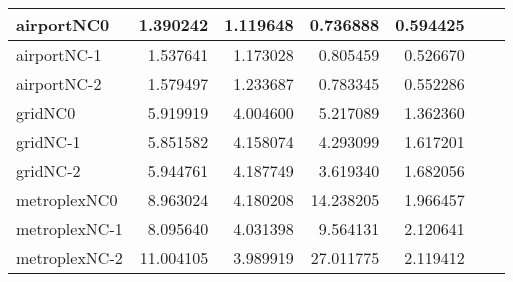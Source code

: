 \begin{longtable}{|l|r|r|r|r|r|r|}
airportNC0 & 1.390242 & 1.119648 & 0.736888 & 0.594425 \\ \hline
airportNC-1 & 1.537641 & 1.173028 & 0.805459 & 0.526670 \\ \hline
airportNC-2 & 1.579497 & 1.233687 & 0.783345 & 0.552286 \\ \hline
gridNC0 & 5.919919 & 4.004600 & 5.217089 & 1.362360 \\ \hline
gridNC-1 & 5.851582 & 4.158074 & 4.293099 & 1.617201 \\ \hline
gridNC-2 & 5.944761 & 4.187749 & 3.619340 & 1.682056 \\ \hline
metroplexNC0 & 8.963024 & 4.180208 & 14.238205 & 1.966457 \\ \hline
metroplexNC-1 & 8.095640 & 4.031398 & 9.564131 & 2.120641 \\ \hline
metroplexNC-2 & 11.004105 & 3.989919 & 27.011775 & 2.119412 \\ \hline
\end{longtable}
